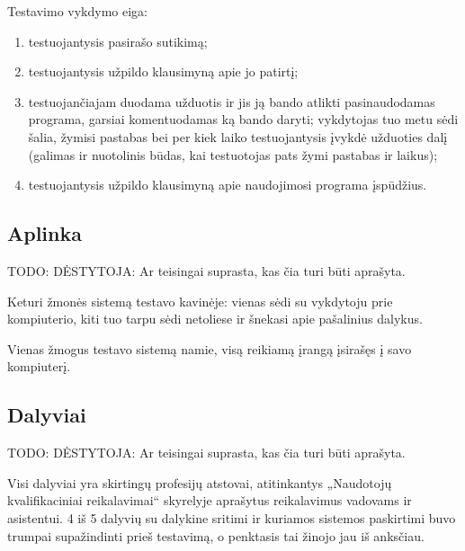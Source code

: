 Testavimo vykdymo eiga:
\begin{enumerate}
  \item testuojantysis pasirašo sutikimą;
  \item testuojantysis užpildo klausimyną apie jo patirtį;
  \item testuojančiajam duodama užduotis ir jis ją bando atlikti
    pasinaudodamas programa, garsiai komentuodamas ką bando daryti;
    vykdytojas tuo metu sėdi šalia, žymisi pastabas bei per kiek
    laiko testuojantysis įvykdė užduoties dalį (galimas ir nuotolinis
    būdas, kai testuotojas pats žymi pastabas ir laikus);
  \item testuojantysis užpildo klausimyną apie naudojimosi programa
    įspūdžius.
\end{enumerate}


\subsection{Aplinka}

TODO: DĖSTYTOJA: Ar teisingai suprasta, kas čia turi būti aprašyta.

Keturi žmonės sistemą testavo kavinėje: vienas sėdi su vykdytoju prie
kompiuterio, kiti tuo tarpu sėdi netoliese ir šnekasi apie pašalinius
dalykus.

Vienas žmogus testavo sistemą namie, visą reikiamą įrangą įsirašęs į
savo kompiuterį.

\subsection{Dalyviai}

TODO: DĖSTYTOJA: Ar teisingai suprasta, kas čia turi būti aprašyta.

Visi dalyviai yra skirtingų profesijų atstovai, atitinkantys
„Naudotojų kvalifikaciniai reikalavimai“ skyrelyje aprašytus reikalavimus
vadovams ir asistentui. 4 iš 5 dalyvių su dalykine sritimi ir kuriamos
sistemos paskirtimi buvo trumpai supažindinti prieš testavimą, o
penktasis tai žinojo jau iš anksčiau.
